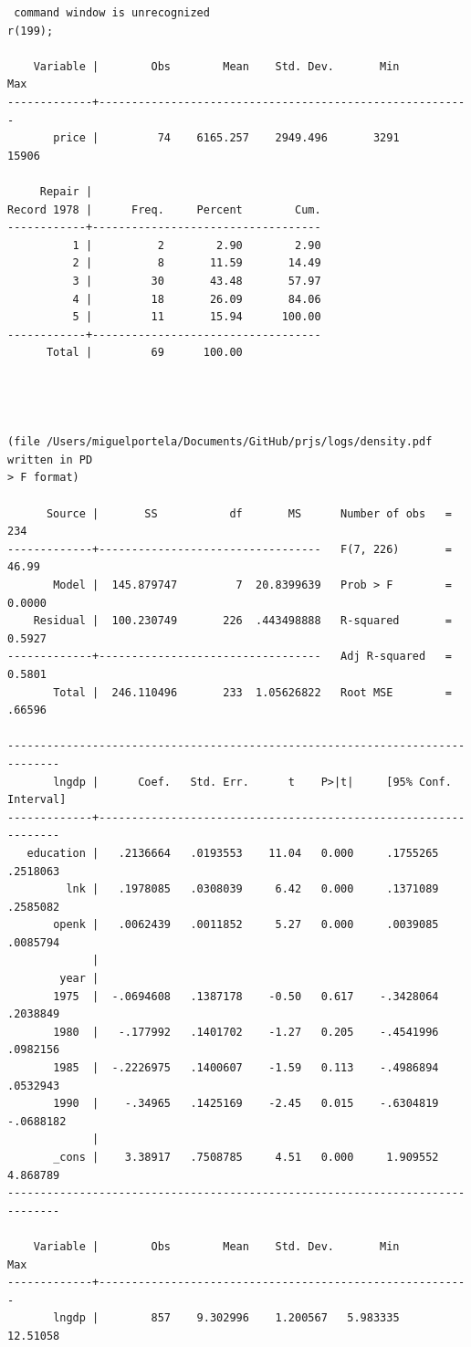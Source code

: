 \documentclass[
  12pt,
]{article}
\begin{document}
\begin{verbatim}
 command window is unrecognized
r(199);

    Variable |        Obs        Mean    Std. Dev.       Min        Max
-------------+---------------------------------------------------------
       price |         74    6165.257    2949.496       3291      15906

     Repair |
Record 1978 |      Freq.     Percent        Cum.
------------+-----------------------------------
          1 |          2        2.90        2.90
          2 |          8       11.59       14.49
          3 |         30       43.48       57.97
          4 |         18       26.09       84.06
          5 |         11       15.94      100.00
------------+-----------------------------------
      Total |         69      100.00




(file /Users/miguelportela/Documents/GitHub/prjs/logs/density.pdf written in PD
> F format)

      Source |       SS           df       MS      Number of obs   =       234
-------------+----------------------------------   F(7, 226)       =     46.99
       Model |  145.879747         7  20.8399639   Prob > F        =    0.0000
    Residual |  100.230749       226  .443498888   R-squared       =    0.5927
-------------+----------------------------------   Adj R-squared   =    0.5801
       Total |  246.110496       233  1.05626822   Root MSE        =    .66596

------------------------------------------------------------------------------
       lngdp |      Coef.   Std. Err.      t    P>|t|     [95% Conf. Interval]
-------------+----------------------------------------------------------------
   education |   .2136664   .0193553    11.04   0.000     .1755265    .2518063
         lnk |   .1978085   .0308039     6.42   0.000     .1371089    .2585082
       openk |   .0062439   .0011852     5.27   0.000     .0039085    .0085794
             |
        year |
       1975  |  -.0694608   .1387178    -0.50   0.617    -.3428064    .2038849
       1980  |   -.177992   .1401702    -1.27   0.205    -.4541996    .0982156
       1985  |  -.2226975   .1400607    -1.59   0.113    -.4986894    .0532943
       1990  |    -.34965   .1425169    -2.45   0.015    -.6304819   -.0688182
             |
       _cons |    3.38917   .7508785     4.51   0.000     1.909552    4.868789
------------------------------------------------------------------------------

    Variable |        Obs        Mean    Std. Dev.       Min        Max
-------------+---------------------------------------------------------
       lngdp |        857    9.302996    1.200567   5.983335   12.51058
\end{verbatim}
\end{document}
